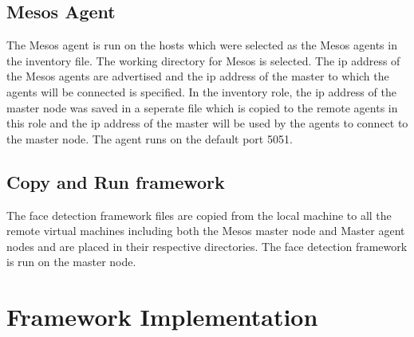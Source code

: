 \documentclass[9pt,twocolumn,twoside]{../../styles/osajnl}
\begin{document}
\subsection{Mesos Agent}
The Mesos agent is run on the hosts which were selected as the Mesos
agents in the inventory file. The working directory for Mesos is
selected.  The ip address of the Mesos agents are advertised and the
ip address of the master to which the agents will be connected is
specified. In the inventory role, the ip address of the master node
was saved in a seperate file which is copied to the remote agents in
this role and the ip address of the master will be used by the agents
to connect to the master node. The agent runs on the default port
5051.

\subsection{Copy and Run framework}
The face detection framework files are copied from the local machine
to all the remote virtual machines including both the Mesos master
node and Master agent nodes and are placed in their respective
directories. The face detection framework is run on the master node.

\section{Framework Implementation}
\end{document}
